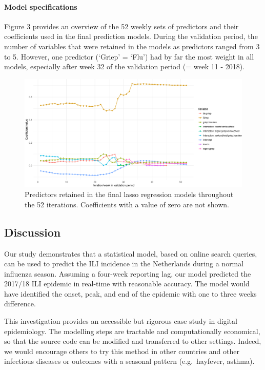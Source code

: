 \documentclass[]{article}
\let\oldparagraph\paragraph
\renewcommand{\paragraph}[1]{\oldparagraph{#1}\mbox{}}
\begin{document}
\hypertarget{model-specifications}{%
\paragraph{\texorpdfstring{\textbf{Model
specifications}}{Model specifications}}\label{model-specifications}}

Figure 3 provides an overview of the 52 weekly sets of predictors and
their coefficients used in the final prediction models. During the
validation period, the number of variables that were retained in the
models as predictors ranged from 3 to 5. However, one predictor (`Griep'
= `Flu') had by far the most weight in all models, especially after week
32 of the validation period (= week 11 - 2018).

\begin{figure}
\centering
\includegraphics{unnamed-chunk-5-1.pdf}
\caption{Predictors retained in the final lasso regression models
throughout the 52 iterations. Coefficients with a value of zero are not
shown.}
\end{figure}

\hypertarget{discussion}{%
\subsection{\texorpdfstring{\textbf{Discussion}}{Discussion}}\label{discussion}}

Our study demonstrates that a statistical model, based on online search
queries, can be used to predict the ILI incidence in the Netherlands
during a normal influenza season. Assuming a four-week reporting lag,
our model predicted the 2017/18 ILI epidemic in real-time with
reasonable accuracy. The model would have identified the onset, peak,
and end of the epidemic with one to three weeks difference.

This investigation provides an accessible but rigorous case study in
digital epidemiology. The modelling steps are tractable and
computationally economical, so that the source code can be modified and
transferred to other settings. Indeed, we would encourage others to try
this method in other countries and other infectious diseases or outcomes
with a seasonal pattern (e.g.~hayfever, asthma).
\end{document}
